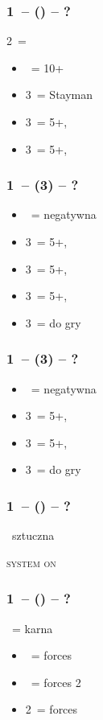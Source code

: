 \documentclass[12pt, a4paper]{report}
\begin{document}
{    \subsubsection*{1\ntx\ -- (\alrts{2\nt}) -- ?}
    2\nt\ = \minor
    \begin{itemize}
        \item \dbl\ = 10+
        \item 3\clubs\ = Stayman
        \item 3\diams\ = 5+\hearts, \invp
        \item 3\hearts\ = 5+\spades, \invp
    \end{itemize}

    \subsubsection*{1\ntx\ -- (3\clubs) -- ?}
    \begin{itemize}
        \item \dbl\ = negatywna
        \item 3\diams\ = 5+\hearts, \invp
        \item 3\hearts\ = 5+\spades, \invp
        \item 3\spades\ = 5+\diams, \invp
        \item 3\nt\ = do gry
    \end{itemize}

    \subsubsection*{1\ntx\ -- (3\diams) -- ?}
    \begin{itemize}
        \item \dbl\ = negatywna
        \item 3\hearts\ = 5+\spades, \invp
        \item 3\spades\ = 5+\hearts, \gf
        \item 3\nt\ = do gry
    \end{itemize}

    \subsubsection*{1\ntx\ -- (\alrts{\dbl}) -- ?}
    \dbl\ sztuczna

    \textsc{system on}

    \subsubsection*{1\ntx\ -- (\dbl) -- ?}
    \dbl\ = karna
    \begin{itemize}
        \item \pass\ = forces \rdbl
        \item \rdbl\ = forces 2\clubs
        \item 2\ = forces 
    \end{itemize}

}
\end{document}
